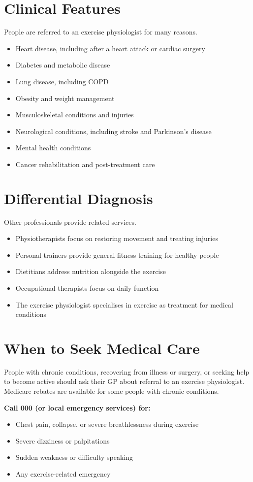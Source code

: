 \section*{Clinical Features}
People are referred to an exercise physiologist for many reasons.
\begin{itemize}
    \item Heart disease, including after a heart attack or cardiac surgery
    \item Diabetes and metabolic disease
    \item Lung disease, including COPD
    \item Obesity and weight management
    \item Musculoskeletal conditions and injuries
    \item Neurological conditions, including stroke and Parkinson's disease
    \item Mental health conditions
    \item Cancer rehabilitation and post-treatment care
\end{itemize}

\section*{Differential Diagnosis}
Other professionals provide related services.
\begin{itemize}
    \item Physiotherapists focus on restoring movement and treating injuries
    \item Personal trainers provide general fitness training for healthy people
    \item Dietitians address nutrition alongside the exercise
    \item Occupational therapists focus on daily function
    \item The exercise physiologist specialises in exercise as treatment for medical conditions
\end{itemize}

\section*{When to Seek Medical Care}
People with chronic conditions, recovering from illness or surgery, or seeking help to become active should ask their GP about referral to an exercise physiologist. Medicare rebates are available for some people with chronic conditions.

\textbf{Call 000 (or local emergency services) for:}
\begin{itemize}
    \item Chest pain, collapse, or severe breathlessness during exercise
    \item Severe dizziness or palpitations
    \item Sudden weakness or difficulty speaking
    \item Any exercise-related emergency
\end{itemize}

